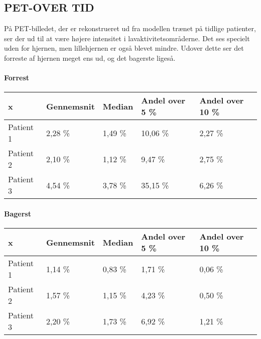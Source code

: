 \subsection{PET-OVER TID}



På PET-billedet, der er rekonstrueret ud fra modellen trænet på tidlige
patienter, ser der ud til at være højere intensitet i
lavaktivitetsområderne. Det ses specielt uden for hjernen, men
lillehjernen er også blevet mindre. Udover dette ser det forreste af
hjernen meget ens ud, og det bagerste ligeså.




\paragraph{Forrest}

\begin{center}
    \begin{tabular}{| l | l | l | l | l |}
    \hline
    x & Gennemsnit & Median & Andel over 5 \% & Andel over 10 \% \\ \hline
    Patient 1 & 2,28 \% & 1,49 \% & 10,06 \% & 2,27 \% \\ \hline
    Patient 2 & 2,10 \% & 1,12 \% & 9,47 \% & 2,75 \% \\ \hline
    Patient 3 & 4,54 \% & 3,78 \% & 35,15 \% & 6,26 \% \\ \hline
    \end{tabular}
\end{center}

\paragraph{Bagerst}

\begin{center}
    \begin{tabular}{| l | l | l | l | l |}
    \hline
    x & Gennemsnit & Median & Andel over 5 \% & Andel over 10 \% \\ \hline
    Patient 1 & 1,14 \% & 0,83 \% & 1,71 \% & 0,06 \% \\ \hline
    Patient 2 & 1,57 \% & 1,15 \% & 4,23 \% & 0,50 \% \\ \hline
    Patient 3 & 2,20 \% & 1,73 \% & 6,92 \% & 1,21 \% \\ \hline
    \end{tabular}
\end{center}

